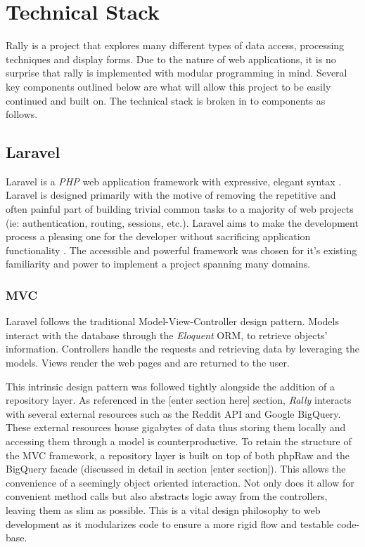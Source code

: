\documentclass[msc,oneside]{ubcthesis}%
\begin{document}
\chapter{Technical Stack}
Rally is a project that explores many different types of data access, processing techniques and display forms. Due to the nature of web applications, it is no surprise that rally is implemented with modular programming in mind. Several key components outlined below are what will allow this project to be easily continued and built on. The technical stack is broken in to components as follows.

\section{Laravel}
Laravel is a \textit{PHP} web application framework with expressive, elegant syntax \citep{Laravel}. Laravel is designed primarily with the motive of removing the repetitive and often painful part of building trivial common tasks to a majority of web projects (ie: authentication, routing, sessions, etc.). Laravel aims to make the development process a pleasing one for the developer without sacrificing application functionality \citep{Laravel}. The accessible and powerful framework was chosen for it's existing familiarity and power to implement a project spanning many domains.

\subsection{MVC}
Laravel follows the traditional Model-View-Controller design pattern. Models interact with the database through the \textit{Eloquent} ORM, to retrieve objects' information. Controllers handle the requests and retrieving data by leveraging the models. Views render the web pages and are returned to the user.\par
This intrinsic design pattern was followed tightly alongside the addition of a repository layer. As referenced in the [enter section here] section, \textit{Rally} interacts with several external resources such as the Reddit API and Google BigQuery. These external resources house gigabytes of data thus storing them locally and accessing them through a model is counterproductive. To retain the structure of the MVC framework, a repository layer is built on top of both phpRaw and the BigQuery facade (discussed in detail in section [enter section]). This allows the convenience of a seemingly object oriented interaction. Not only does it allow for convenient method calls but also abstracts logic away from the controllers, leaving them as slim as possible. This is a vital design philosophy to web development as it modularizes code to ensure a more rigid flow and testable code-base.  
\end{document}
